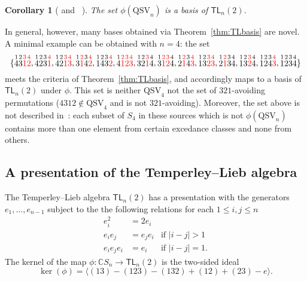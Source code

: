 \documentclass[12pt]{article}
\newtheorem{cor}[equation]{Corollary}
\theoremstyle{definition}
\theoremstyle{remark}
\numberwithin{equation}{section}
\newcommand{\CC}{\mathbb{C}}
\renewcommand{\to}{\longrightarrow}
\newcommand{\TL}{\mathsf{TL}}
\newcommand{\QSV}{\mathrm{QSV}}
\begin{document}
\begin{cor}[{\cite{GobetWilliams} and~\cite{Zinno} }]
The set $\phi(\QSV_{n})$ is a basis of $\TL_{n}(2)$.
\end{cor}

In general, however, many bases obtained via Theorem~\ref{thm:TLbasis} are novel.  A minimal example can be obtained with $n = 4$: the set 
\[
\{
\stackrel{1}{4} \stackrel{2}{3} \color{red} \stackrel{3}{1} \stackrel{4}{2} \color{black}, 
\stackrel{1}{4} \stackrel{2}{2} \stackrel{3}{3}  \color{red} \stackrel{4}{1} \color{black}, 
\stackrel{1}{4} \stackrel{2}{2}\color{red}  \stackrel{3}{1} \stackrel{4}{3} \color{black}, 
\stackrel{1}{3} \color{red}  \stackrel{2}{1} \color{black} \stackrel{3}{4} \color{red} \stackrel{4}{2}\color{black} , 
\stackrel{1}{1} \stackrel{2}{4} \stackrel{3}{3} \color{red} \stackrel{4}{2} \color{black}, 
\stackrel{1}{4} \color{red} \stackrel{2}{1} \stackrel{3}{2} \stackrel{4}{3} \color{black}, 
\stackrel{1}{3} \stackrel{2}{2} \color{red} \stackrel{3}{1} \color{black} \stackrel{4}{4}, 
\stackrel{1}{3} \color{red} \stackrel{2}{1} \stackrel{3}{2} \color{black} \stackrel{4}{4}, 
\stackrel{1}{2} \color{red} \stackrel{2}{1} \color{black} \stackrel{3}{4} \color{red} \stackrel{4}{3} \color{black}, 
\stackrel{1}{1} \stackrel{2}{3} \color{red} \stackrel{3}{2} \stackrel{4}{3} \color{black}, 
\stackrel{1}{2}  \color{red} \stackrel{2}{1} \color{black} \stackrel{3}{3} \stackrel{4}{4}, 
\stackrel{1}{1} \stackrel{2}{3} \color{red} \stackrel{3}{2} \color{black} \stackrel{4}{4}, 
\stackrel{1}{1} \stackrel{2}{2} \stackrel{3}{4}  \color{red} \stackrel{4}{3} \color{black},
\stackrel{1}{1} \stackrel{2}{2} \stackrel{3}{3} \stackrel{4}{4}
\}
\]
meets the criteria of Theorem~\ref{thm:TLbasis}, and accordingly maps to a basis of $\TL_{n}(2)$ under $\phi$. 
This set is neither $\QSV_{4}$ not the set of $321$-avoiding permutations ($4312 \notin \QSV_{4}$ and is not $321$-avoiding).
Moreover, the set above is not described in~\cite{GobetWilliams, Zinno}: each subset of $S_{4}$ in these sources which is not $\phi(\QSV_{n})$ contains more than one element from certain excedance classes and none from others.  

\subsection{A presentation of the Temperley--Lieb algebra}
\label{sec:TLpres}

The Temperley--Lieb algebra $\TL_{n}(2)$ has a presentation with the generators $e_{1}, \ldots, e_{n-1}$ subject to the the following relations for each $1 \le i , j \le n$
\[
\begin{array}{rll}
e_{i}^{2} &= 2 e_{i} \\
e_{i}e_{j} &= e_{j}e_{i} & \text{if $|i - j| > 1$} \\
e_{i} e_{j} e_{i} &= e_{i} &  \text{if $|i - j| = 1$}.
\end{array}
\]
The kernel of the map $\phi: \CC S_{n} \to \TL_{n}(2)$ is the two-sided ideal
\[
\ker(\phi) = \langle (13) - (123) - (132) + (12) + (23) - e \rangle.
\]
\end{document}
